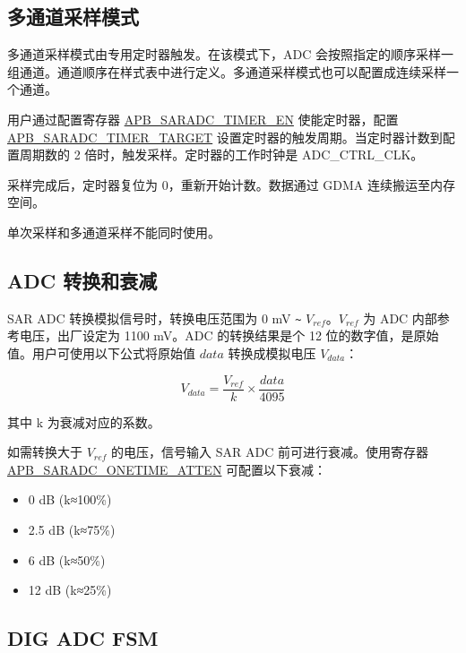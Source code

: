 \documentclass[main\_\_CN.tex]{subfiles}
\begin{document}
\subsection{多通道采样模式}
\label{sec:sar-adc-multi-channel-sampling-mode}

多通道采样模式由专用定时器触发。在该模式下，ADC 会按照指定的顺序采样一组通道。通道顺序在样式表中进行定义。多通道采样模式也可以配置成连续采样一个通道。

用户通过配置寄存器 \hyperref[fielddesc:APBSARADCTIMEREN]{APB\_SARADC\_TIMER\_EN} 使能定时器，配置 \hyperref[fielddesc:APBSARADCTIMERTARGET]{APB\_SARADC\_TIMER\_TARGET} 设置定时器的触发周期。当定时器计数到配置周期数的 2 倍时，触发采样。定时器的工作时钟是 ADC\_CTRL\_CLK。

采样完成后，定时器复位为 0，重新开始计数。数据通过 GDMA 连续搬运至内存空间。

\begin{tiplisting}
单次采样和多通道采样不能同时使用。
\end{tiplisting}

\subsection{ADC 转换和衰减}
\label{sec:sar-adc-conversion-and attenuation}

SAR ADC 转换模拟信号时，转换电压范围为 0 mV \verb+~+ \(V_{ref}\)。\(V_{ref}\) 为 ADC 内部参考电压，出厂设定为 1100 mV。ADC 的转换结果是个 12 位的数字值，是原始值。用户可使用以下公式将原始值 \(data\) 转换成模拟电压 \(V_{data}\)：

    \[
    V_{data} = \frac{V_{ref}}{k}\times{\frac{data}{4095}}
    \]

其中 k 为衰减对应的系数。

如需转换大于 \(V_{ref}\) 的电压，信号输入 SAR ADC 前可进行衰减。使用寄存器 \hyperref[fielddesc:APBSARADCONETIMEATTEN]{APB\_SARADC\_ONETIME\_ATTEN} 可配置以下衰减：

\begin{itemize}
    \item 0 dB (k≈100\%)
    \item 2.5 dB (k≈75\%)
    \item 6 dB (k≈50\%)
    \item 12 dB (k≈25\%)
\end{itemize}

\subsection{DIG ADC FSM}
\label{sec:sar-adc-dig-adc-fsm}
\end{document}
